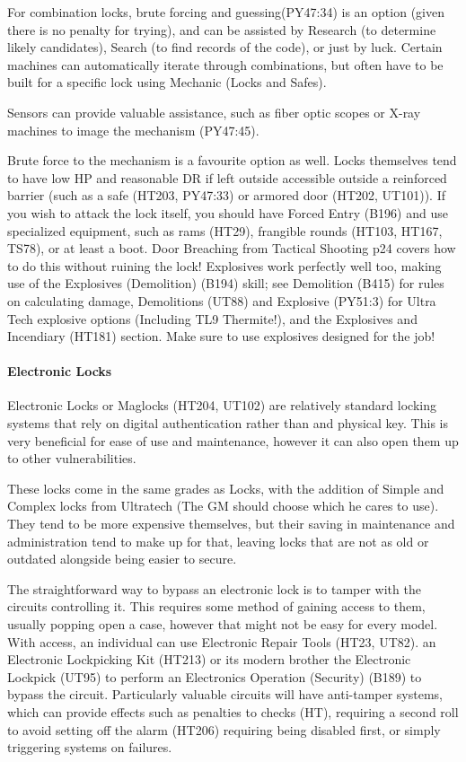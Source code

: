 \begin{multicols*}{2}
	For combination locks, brute forcing and guessing(PY47:34) is an option (given there is no penalty for trying), and can be assisted by Research (to determine likely candidates), Search (to find records of the code), or just by luck. Certain machines can automatically iterate through combinations, but often have to be built for a specific lock using Mechanic (Locks and Safes).
	
	Sensors can provide valuable assistance, such as fiber optic scopes or X-ray machines to image the mechanism (PY47:45).
	
	Brute force to the mechanism is a favourite option as well. Locks themselves tend to have low HP and reasonable DR if left outside accessible outside a reinforced barrier (such as a safe (HT203, PY47:33) or armored door (HT202, UT101)). If you wish to attack the lock itself, you should have Forced Entry (B196) and use specialized equipment, such as rams (HT29), frangible rounds (HT103, HT167, TS78), or at least a boot. Door Breaching from Tactical Shooting p24 covers how to do this without ruining the lock! Explosives work perfectly well too, making use of the Explosives (Demolition) (B194) skill; see Demolition (B415) for rules on calculating damage, Demolitions (UT88) and Explosive (PY51:3) for Ultra Tech explosive options (Including TL9 Thermite!), and the Explosives and Incendiary (HT181) section. Make sure to use explosives designed for the job! 
	
	\paragraph{Electronic Locks}
	
	Electronic Locks or Maglocks (HT204, UT102) are relatively standard locking systems that rely on digital authentication rather than and physical key. This is very beneficial for ease of use and maintenance, however it can also open them up to other vulnerabilities.
	
	These locks come in the same grades as Locks, with the addition of Simple and Complex locks from Ultratech (The GM should choose which he cares to use). They tend to be more expensive themselves, but their saving in maintenance and administration tend to make up for that, leaving locks that are not as old or outdated alongside being easier to secure.
	
	The straightforward way to bypass an electronic lock is to tamper with the circuits controlling it. This requires some method of gaining access to them, usually popping open a case, however that might not be easy for every model. With access, an individual can use Electronic Repair Tools (HT23, UT82). an Electronic Lockpicking Kit (HT213) or its modern brother the Electronic Lockpick (UT95) to perform an Electronics Operation (Security) (B189) to bypass the circuit. Particularly valuable circuits will have anti-tamper systems, which can provide effects such as penalties to checks (HT), requiring a second roll to avoid setting off the alarm (HT206) requiring being disabled first, or simply triggering systems on failures.
	

\end{multicols*}
